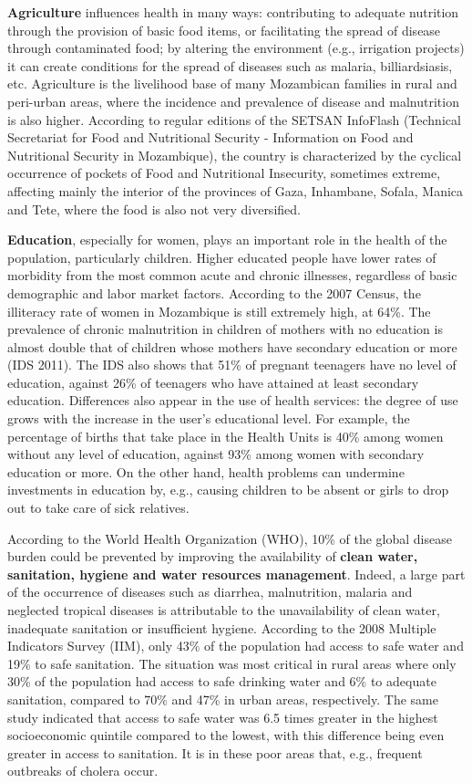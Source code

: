 \documentclass[
]{book}
\begin{document}
\textbf{Agriculture} influences health in many ways: contributing to adequate nutrition through the provision of basic food items, or facilitating the spread of disease through contaminated food; by altering the environment (e.g., irrigation projects) it can create conditions for the spread of diseases such as malaria, billiardsiasis, etc. Agriculture is the livelihood base of many Mozambican families in rural and peri-urban areas, where the incidence and prevalence of disease and malnutrition is also higher. According to regular editions of the SETSAN InfoFlash (Technical Secretariat for Food and Nutritional Security - Information on Food and Nutritional Security in Mozambique), the country is characterized by the cyclical occurrence of pockets of Food and Nutritional Insecurity, sometimes extreme, affecting mainly the interior of the provinces of Gaza, Inhambane, Sofala, Manica and Tete, where the food is also not very diversified.

\textbf{Education}, especially for women, plays an important role in the health of the population, particularly children. Higher educated people have lower rates of morbidity from the most common acute and chronic illnesses, regardless of basic demographic and labor market factors. According to the 2007 Census, the illiteracy rate of women in Mozambique is still extremely high, at 64\%. The prevalence of chronic malnutrition in children of mothers with no education is almost double that of children whose mothers have secondary education or more (IDS 2011). The IDS also shows that 51\% of pregnant teenagers have no level of education, against 26\% of teenagers who have attained at least secondary education. Differences also appear in the use of health services: the degree of use grows with the increase in the user's educational level. For example, the percentage of births that take place in the Health Units is 40\% among women without any level of education, against 93\% among women with secondary education or more. On the other hand, health problems can undermine investments in education by, e.g., causing children to be absent or girls to drop out to take care of sick relatives.

According to the World Health Organization (WHO), 10\% of the global disease burden could be prevented by improving the availability of \textbf{clean water, sanitation, hygiene and water resources management}. Indeed, a large part of the occurrence of diseases such as diarrhea, malnutrition, malaria and neglected tropical diseases is attributable to the unavailability of clean water, inadequate sanitation or insufficient hygiene. According to the 2008 Multiple Indicators Survey (IIM), only 43\% of the population had access to safe water and 19\% to safe sanitation. The situation was most critical in rural areas where only 30\% of the population had access to safe drinking water and 6\% to adequate sanitation, compared to 70\% and 47\% in urban areas, respectively. The same study indicated that access to safe water was 6.5 times greater in the highest socioeconomic quintile compared to the lowest, with this difference being even greater in access to sanitation. It is in these poor areas that, e.g., frequent outbreaks of cholera occur.
\end{document}
